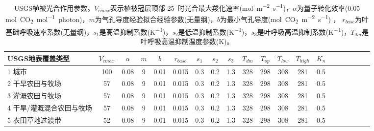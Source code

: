 \begin{landscape}
\begin{table}[htbp]
    \centering
    \caption{USGS植被光合作用参数。$V_{cmax}$表示植被冠层顶部 25~\textcelsius 时光合最大羧化速率(\unit{mol.m^{-2}.s^{-1}})，$\alpha$为量子转化效率(0.05 \unit{mol.CO_2.mol^{-1}.photon})，$m$为气孔导度经验拟合经验参数(无量纲)，$b$为最小气孔导度(\unit{mol.CO_2.m^{-2}.s^{-1}}) ，
    $r_{base}$为叶基础呼吸速率系数(无量纲)，$s_1$是高温抑制系数(\unit{K^{-1}})，$s_2$是低温抑制系数(\unit{K^{-1}})，$s_3$是叶呼吸高温抑制系数(\unit{K^{-1}})，$T_{dm}$是叶呼吸高温抑制温度参数(K)。}
    \label{tab:USGS植被光合作用参数1}
    \begin{tabular}{@{}lccccccccccccccccccc@{}}
    \toprule
    USGS地表覆盖类型     &$ V_{cmax}$ & $\alpha$ & $m$& $b$ & $r_{base}$ & $s_1$ & $s_2$ & $s_3$ & $T_{dm}$ & $T_{op}$ & $T_{low}$ & $T_{high}$ & $K_n$  \\ \midrule
    1 城市     & 100  & 0.08  & 9  & 0.01  & 0.015  & 0.3 & 0.2 & 1.3  & 328  & 298  & 308  & 281  & 0.5 \\
    2 干旱农田与牧场      & 57  & 0.08  & 9  & 0.01   & 0.015 & 0.3  & 0.2  & 1.3  & 328   & 298  & 308  & 281  & 0.5  \\
    3 灌溉农田与牧场      & 57  & 0.08  & 9  & 0.01   & 0.015 & 0.3  & 0.2 & 1.3   & 328   & 298  & 308 & 281   & 0.5  \\
    4 干旱/灌溉混合农田与牧场 & 57  & 0.08  & 9  & 0.01  & 0.015  & 0.3  & 0.2  & 1.3  & 328  & 298 & 308 & 281   & 0.5  \\
    5 农田草地过渡带      & 52                                                                & 0.08                                                                                                   & 9                                                                                  & 0.01                                                                               & 0.015                                                               & 0.3                                                       & 0.2                                                       & 1.3                                                       & 328                                                             & 298                                                             & 308                                                              & 281                                                               & 0.5                                                          \\

\end{tabular}
\end{table}
\end{landscape}
